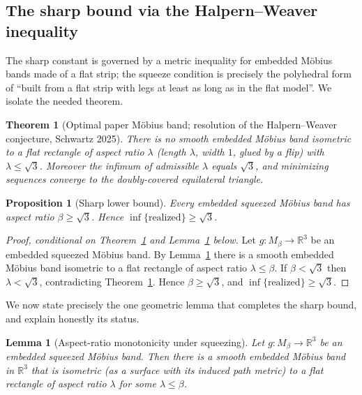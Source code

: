 \documentclass[11pt]{article}
\newtheorem{theorem}{Theorem}
\newtheorem{lemma}{Lemma}
\newtheorem{proposition}{Proposition}
\theoremstyle{definition}
\newcommand{\R}{\mathbb{R}}
\begin{document}
\subsection{The sharp bound via the Halpern--Weaver inequality}

The sharp constant is governed by a metric inequality for embedded M\"obius bands made of a
flat strip; the squeeze condition is precisely the polyhedral form of ``built from a flat
strip with legs at least as long as in the flat model''. We isolate the needed theorem.

\begin{theorem}[Optimal paper M\"obius band; resolution of the Halpern--Weaver
conjecture, Schwartz 2025]\label{thm:HW}
There is no smooth embedded M\"obius band isometric to a flat rectangle of aspect ratio
$\lambda$ (length $\lambda$, width $1$, glued by a flip) with $\lambda\le\sqrt3$. Moreover
the infimum of admissible $\lambda$ equals $\sqrt3$, and minimizing sequences converge to the
doubly-covered equilateral triangle.
\end{theorem}

\begin{proposition}[Sharp lower bound]\label{prop:sharp}
Every embedded squeezed M\"obius band has aspect ratio $\beta\ge\sqrt3$. Hence
$\inf\{\text{realized}\}\ge\sqrt3$.
\end{proposition}

\begin{proof}[Proof, conditional on Theorem~\ref{thm:HW} and Lemma~\ref{lem:mono} below]
Let $g:M_\beta\to\R^3$ be an embedded squeezed M\"obius band. By Lemma~\ref{lem:mono} there
is a smooth embedded M\"obius band isometric to a flat rectangle of aspect ratio
$\lambda\le\beta$. If $\beta<\sqrt3$ then $\lambda<\sqrt3$, contradicting
Theorem~\ref{thm:HW}. Hence $\beta\ge\sqrt3$, and $\inf\{\text{realized}\}\ge\sqrt3$.
\end{proof}

We now state precisely the one geometric lemma that completes the sharp bound, and explain
honestly its status.

\begin{lemma}[Aspect-ratio monotonicity under squeezing]\label{lem:mono}
Let $g:M_\beta\to\R^3$ be an embedded squeezed M\"obius band. Then there is a smooth
embedded M\"obius band in $\R^3$ that is isometric (as a surface with its induced path
metric) to a flat rectangle of aspect ratio $\lambda$ for some $\lambda\le\beta$.
\end{lemma}
\end{document}
